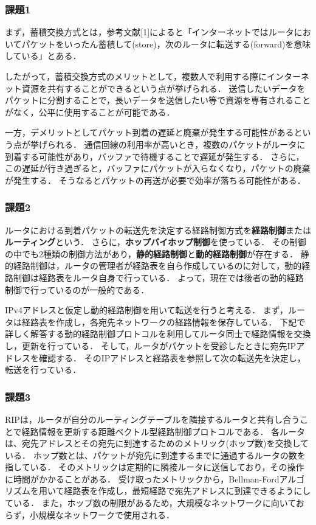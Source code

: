 \documentclass[documentclass]{jsarticle}
\begin{document}
\subsubsection*{課題1}
まず，蓄積交換方式とは，参考文献[1]によると「インターネットではルータにおいてパケットをいったん蓄積して(store)，次のルータに転送する(forward)を意味している」とある．

したがって，蓄積交換方式のメリットとして，複数人で利用する際にインターネット資源を共有することができるという点が挙げられる．
送信したいデータをパケットに分割することで，長いデータを送信したい等で資源を専有されることがなく，公平に使用することが可能である．

一方，デメリットとしてパケット到着の遅延と廃棄が発生する可能性があるという点が挙げられる．
通信回線の利用率が高いとき，複数のパケットがルータに到着する可能性があり，バッファで待機することで遅延が発生する．
さらに，この遅延が行き過ぎると，バッファにパケットが入らなくなり，パケットの廃棄が発生する．
そうなるとパケットの再送が必要で効率が落ちる可能性がある．

\subsubsection*{課題2}
ルータにおける到着パケットの転送先を決定する経路制御方式を\textbf{経路制御}または\textbf{ルーティング}という．
さらに，\textbf{ホップバイホップ制御}を使っている．
その制御の中でも2種類の制御方法があり，\textbf{静的経路制御}と\textbf{動的経路制御}が存在する．
静的経路制御は，ルータの管理者が経路表を自ら作成しているのに対して，動的経路制御は経路表をルータ自身で行っている．
よって，現在では後者の動的経路制御で行っているのが一般的である．

IPv4アドレスと仮定し動的経路制御を用いて転送を行うと考える．
まず，ルータは経路表を作成し，各宛先ネットワークの経路情報を保存している．
下記で詳しく解答する動的経路制御プロトコルを利用してルータ同士で経路情報を交換し，更新を行っている．
そして，ルータがパケットを受診したときに宛先IPアドレスを確認する．
そのIPアドレスと経路表を参照して次の転送先を決定し，転送を行っている．

\subsubsection*{課題3}
RIPは，ルータが自分のルーティングテーブルを隣接するルータと共有し合うことで経路情報を更新する距離ベクトル型経路制御プロトコルである．
各ルータは、宛先アドレスとその宛先に到達するためのメトリック(ホップ数)を交換している．
ホップ数とは、パケットが宛先に到達するまでに通過するルータの数を指している．
そのメトリックは定期的に隣接ルータに送信しており，その操作に時間がかかることがある．
受け取ったメトリックから，Bellman-Fordアルゴリズムを用いて経路表を作成し，最短経路で宛先アドレスに到達できるようにしている．
また，ホップ数の制限があるため，大規模なネットワークに向いておらず，小規模なネットワークで使用される．
\end{document}
